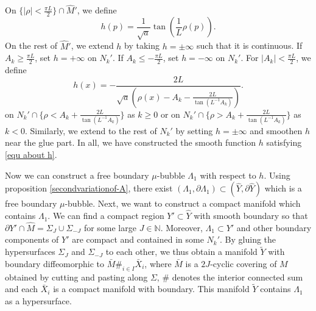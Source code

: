 \documentclass[11pt,letterpaper]{amsart}
\theoremstyle{definition}
\theoremstyle{remark}
\numberwithin{equation}{section}
\begin{document}


On $\{|\rho|<\frac{\pi L}{2}\}\cap \hat{M}'$, we define 
\[
    h(p) = \frac{1}{\sqrt{a}}\tan(\frac{1}{L}\rho(p)).
\] 
On the rest of $\hat{M}'$, we extend $h$ by taking $ h=\pm \infty$ such that it is continuous. 
If $A_{k}\geq \frac{\pi L}{2}$, set $h=+\infty$ on $ N_{k}'$. If $A_{k}\leq-\frac{\pi L}{2}$, set $h=-\infty$ on $N_{k}'$. For $|A_{k}|< \frac{\pi L}{2}$, 
we define 
\[
h(x) = -\frac{2L}{\sqrt{a}(\rho(x)-A_{k}-\frac{2L}{\tan(L^{-1}A_{k})})}.
\]
on $N_{k}'\cap \{\rho<A_{k}+\frac{2L}{\tan(L^{-1}A_{k})}\}$ as $k\geq 0$ or on $N_{k}'\cap \{\rho>A_{k}+\frac{2L}{\tan(L^{-1}A_{k})}\}$ as $k< 0$.
Similarly, we extend to the rest of $N_{k}'$ by setting $h=\pm \infty$ and smoothen $h$ near the glue part.  In all, we have constructed the smooth function $h$ satisfying \eqref{equ about h}.

Now we can construct a free boundary $\mu$-bubble $\Lambda_{1}$ with respect to $h$. Using proposition \ref{secondvariationof-A}, there exist $(\Lambda_{1},\partial \Lambda_{1})\subset (\hat{Y},\partial\hat{Y})$ which is a free boundary $\mu$-bubble. Next, we want to construct a compact manifold which contains $\Lambda_{1}$. We can find a compact region $Y'\subset \hat{Y}$ with smooth boundary so that $\partial Y' \cap \hat{M} = \Sigma_{J} \cup \Sigma_{-J}$ for some large $J \in \mathbb{N}$. Moreover, $\Lambda_{1}\subset Y'$ and other boundary components of $Y'$ are compact and contained in some $N_k'$. By gluing the hypersurfaces $\Sigma_{J}$ and $\Sigma_{-J}$ to each other, we thus
obtain a manifold $\tilde{Y}$ with boundary diffeomorphic to $\bar{M} \#_{i\in I} \bar{X}_{i}$, where $\bar{M}$ is a $2J$-cyclic covering of $M$
obtained by cutting and pasting along $\Sigma$, $\#$ denotes the interior connected sum and each $\bar{X}_{i}$ is a compact manifold with boundary. This manifold $\tilde{Y}$ contains $\Lambda_1$ as a hypersurface.
\end{document}
